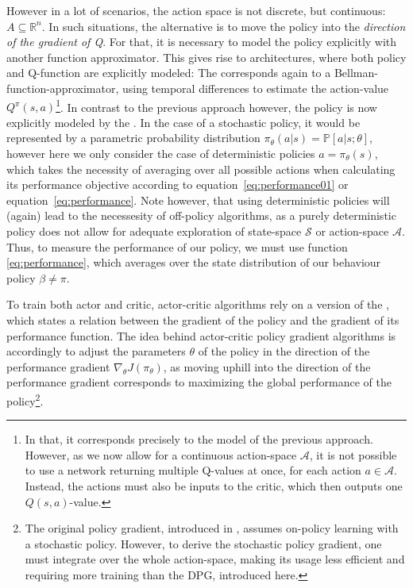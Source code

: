 \noindent However in a lot of scenarios, the action space is not discrete, but continuous: \mbox{$A \subseteq \mathds{R}^n$}. In such situations, the alternative is to move the policy into the \textit{direction of the gradient of Q}. For that, it is necessary to model the policy explicitly with another function approximator. This gives rise to  architectures, where both policy and Q-function are explicitly modeled: The  corresponds again to a Bellman-function-approximator, using temporal differences to estimate the action-value $Q^\pi(s,a)$\footnote{In that, it corresponds precisely to the model of the previous approach. However, as we now allow for a continuous action-space $\mathcal{A}$, it is not possible to use a network returning multiple Q-values at once, for each action $a \in \mathcal{A}$. Instead, the actions must also be inputs to the critic, which then outputs one $Q(s,a)$-value.}. In contrast to the previous approach however, the policy is now explicitly modeled by the . In the case of a stochastic policy, it would be represented by a parametric probability distribution $\pi_\theta(a|s) = \mathds{P}[a|s;\theta]$, however here we only consider the case of deterministic policies $a = \pi_\theta(s)$, which takes the necessity of averaging over all possible actions when calculating its performance objective according to equation~\ref{eq:performance01} or equation~\ref{eq:performance}. Note however, that using deterministic policies will (again) lead to the necessesity of off-policy algorithms, as a purely deterministic policy does not allow for adequate exploration of state-space $\mathcal{S}$ or action-space $\mathcal{A}$. Thus, to measure the performance of our policy, we must use function \ref{eq:performance}, which averages over the state distribution of our behaviour policy $\beta \neq \pi$. 

To train both actor and critic, actor-critic algorithms rely on a version of the , which states a relation between the gradient of the policy and the gradient of its performance function. The idea behind actor-critic policy gradient algorithms is accordingly to adjust the parameters $\theta$ of the policy in the direction of the performance gradient $\nabla_{\theta}J(\pi_\theta)$, as moving uphill into the direction of the performance gradient corresponds to maximizing the global performance of the policy\footnote{The original policy gradient, introduced in \cite{sutton_policy_2000}, assumes on-policy learning with a stochastic policy. However, to derive the stochastic policy gradient, one must integrate over the whole action-space, making its usage less efficient and requiring more training than the DPG, introduced here.}.

